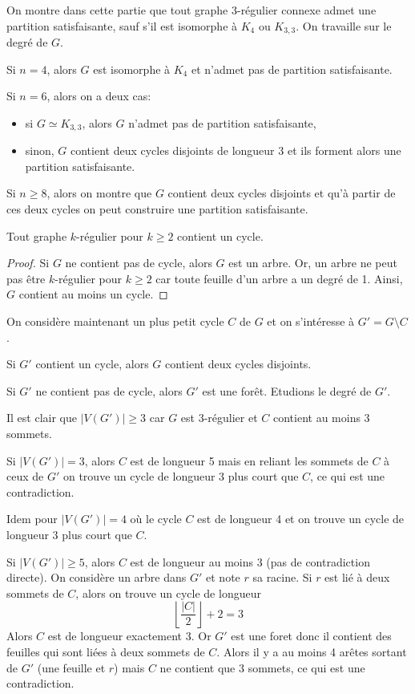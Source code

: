 On montre dans cette partie que tout graphe \(3\)-régulier connexe admet une partition satisfaisante, sauf s’il est isomorphe à \(K_4\) ou \(K_{3,3}\). On travaille sur le degré de \(G\).

Si \(n = 4\), alors \(G\) est isomorphe à \(K_4\) et n’admet pas de partition satisfaisante.

Si \(n = 6\), alors on a deux cas:
\begin{itemize}
    \item si \(G \simeq K_{3,3}\), alors \(G\) n’admet pas de partition satisfaisante,
    \item sinon, \(G\) contient deux cycles disjoints de longueur 3 et ils forment alors une partition satisfaisante.
\end{itemize}

Si \(n \geq 8\), alors on montre que \(G\) contient deux cycles disjoints et qu'à partir de ces deux cycles on peut construire une partition satisfaisante.

\begin{proposition}
    Tout graphe \(k\)-régulier pour \(k \geq 2\) contient un cycle.
\end{proposition}

\begin{proof}
    Si \(G\) ne contient pas de cycle, alors \(G\) est un arbre.
    Or, un arbre ne peut pas être \(k\)-régulier pour \(k \geq 2\) car toute feuille d’un arbre a un degré de 1.
    Ainsi, \(G\) contient au moins un cycle.
\end{proof}

On considère maintenant un plus petit cycle \(C\) de \(G\) et on s’intéresse à \(G' = G \setminus C\).

Si \(G'\) contient un cycle, alors \(G\) contient deux cycles disjoints.

Si \(G'\) ne contient pas de cycle, alors \(G'\) est une forêt.
Etudions le degré de \(G'\).

Il est clair que \(|V(G')| \geq 3\) car \(G\) est \(3\)-régulier et \(C\) contient au moins 3 sommets.

Si \(|V(G')| = 3\), alors \(C\) est de longueur 5 mais en reliant les sommets de \(C\) à ceux de \(G'\) on trouve un cycle de longueur 3 plus court que \(C\), ce qui est une contradiction.

Idem pour \(|V(G')| = 4\) où le cycle \(C\) est de longueur 4 et on trouve un cycle de longueur 3 plus court que \(C\).

Si \(|V(G')| \geq 5\), alors \(C\) est de longueur au moins 3 (pas de contradiction directe).
On considère un arbre dans \(G'\) et note \(r\) sa racine. Si \(r\) est lié à deux sommets de \(C\), alors on trouve un cycle de longueur
\begin{equation*}
    \left\lfloor \frac{|C|}{2} \right\rfloor + 2 = 3
\end{equation*}
Alors \(C\) est de longueur exactement 3.
Or \(G'\) est une foret donc il contient des feuilles qui sont liées à deux sommets de \(C\). Alors il y a au moins 4 arêtes sortant de \(G'\) (une feuille et \(r\)) mais \(C\) ne contient que 3 sommets, ce qui est une contradiction.

